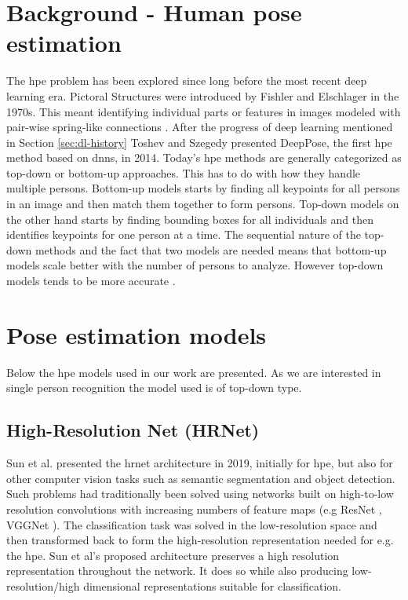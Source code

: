 \section{Background - Human pose estimation}
The \gls{hpe} problem has been explored since long before the most recent deep learning era. Pictoral Structures were introduced by Fishler and Elschlager in the 1970s. This meant identifying individual parts or features in images modeled with pair-wise spring-like connections \cite{Fischler1973}. After the progress of deep learning mentioned in Section \ref{sec:dl-history} Toshev and Szegedy \cite{Toshev2014} presented DeepPose, the first \gls{hpe} method based on \glspl{dnn}, in 2014. Today's \gls{hpe} methods are generally categorized as top-down or bottom-up approaches. This has to do with how they handle multiple persons. Bottom-up models starts by finding all keypoints for all persons in an image and then match them together to form persons. Top-down models on the other hand starts by finding bounding boxes for all individuals and then identifies keypoints for one person at a time. The sequential nature of the top-down methods and the fact that two models are needed means that bottom-up models scale better with the number of persons to analyze. However top-down models tends to be more accurate \cite{Cheng2019}.

\section{Pose estimation models}
Below the \gls{hpe} models used in our work are presented. As we are interested in single person recognition the model used is of top-down type.

\subsection{High-Resolution Net (HRNet)} \label{sec:hrnet}
Sun et al. \cite{Sun2019} presented the \gls{hrnet} architecture in 2019, initially for \gls{hpe}, but also for other computer vision tasks such as semantic segmentation and object detection. Such problems had traditionally been solved using networks built on high-to-low resolution convolutions with increasing numbers of feature maps (e.g ResNet \cite{He2016}, VGGNet \cite{Simonyan2015}). The classification task was solved in the low-resolution space and then transformed back to form the high-resolution representation needed for e.g. the \gls{hpe}. Sun et al's proposed architecture preserves a high resolution representation throughout the network. It does so while also producing low-resolution/high dimensional representations suitable for classification.

